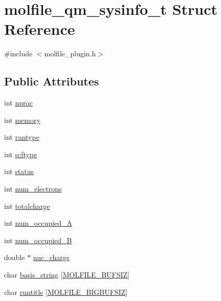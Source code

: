 \hypertarget{structmolfile__qm__sysinfo__t}{\section{molfile\-\_\-qm\-\_\-sysinfo\-\_\-t \-Struct \-Reference}
\label{structmolfile__qm__sysinfo__t}
}


{\ttfamily \#include $<$molfile\-\_\-plugin.\-h$>$}

\subsection*{\-Public \-Attributes}
\begin{DoxyCompactItemize}
\item 
int \hyperlink{structmolfile__qm__sysinfo__t_a5cae7d1af0e8e824450a7f7c0c645a00}{nproc}
\item 
int \hyperlink{structmolfile__qm__sysinfo__t_a45b68b0f4992722d252ed143a8113981}{memory}
\item 
int \hyperlink{structmolfile__qm__sysinfo__t_afd30b4b270a375091eda6773bbb52dbb}{runtype}
\item 
int \hyperlink{structmolfile__qm__sysinfo__t_a311514821c1c527a1158216aa77a9211}{scftype}
\item 
int \hyperlink{structmolfile__qm__sysinfo__t_a5a58f87d6b83cc830a29305ebe7fc06d}{status}
\item 
int \hyperlink{structmolfile__qm__sysinfo__t_af404a054742733a12370337ab16e8402}{num\-\_\-electrons}
\item 
int \hyperlink{structmolfile__qm__sysinfo__t_a066fb9a625e44a055098a0ce68788f48}{totalcharge}
\item 
int \hyperlink{structmolfile__qm__sysinfo__t_abedde2233b27f6e8f90969b4803bb916}{num\-\_\-occupied\-\_\-\-A}
\item 
int \hyperlink{structmolfile__qm__sysinfo__t_ab5d5296c0be3d877a973dfd1ea2affe9}{num\-\_\-occupied\-\_\-\-B}
\item 
double $\ast$ \hyperlink{structmolfile__qm__sysinfo__t_ad6978efaba2f2536a9cc7d72fb111e8c}{nuc\-\_\-charge}
\item 
char \hyperlink{structmolfile__qm__sysinfo__t_afab62a79c9f1fc05307afb1ce061ef7d}{basis\-\_\-string} \mbox{[}\hyperlink{molfile__plugin_8h_adb121359484e3cbc0e035963e95ec867}{\-M\-O\-L\-F\-I\-L\-E\-\_\-\-B\-U\-F\-S\-I\-Z}\mbox{]}
\item 
char \hyperlink{structmolfile__qm__sysinfo__t_ab95a65da81080c566056e0c0bb3993a7}{runtitle} \mbox{[}\hyperlink{molfile__plugin_8h_a850033d482c619358ce953c8aae52142}{\-M\-O\-L\-F\-I\-L\-E\-\_\-\-B\-I\-G\-B\-U\-F\-S\-I\-Z}\mbox{]}

\end{DoxyCompactItemize}
